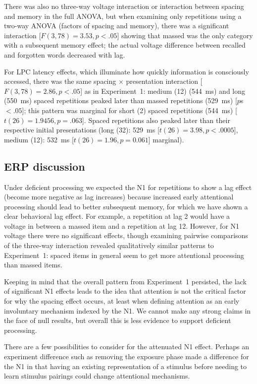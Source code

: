 There was also no three-way voltage interaction or interaction between spacing and memory in the full ANOVA, but when examining only repetitions using a two-way ANOVA (factors of spacing and memory), there was a significant interaction [$F(3,78)=3.53, p<.05$] showing that massed was the only category with a subsequent memory effect; the actual voltage difference between recalled and forgotten words decreased with lag.

For LPC latency effects, which illuminate how quickly information is consciously accessed, there was the same spacing $\times$ presentation interaction [$F(3,78)=2.86, p<.05$] as in Experiment~1: medium (12) (544~ms) and long (550~ms) spaced repetitions peaked later than massed repetitions (529~ms) [$p$s~$<.05$]; this pattern was marginal for short (2) spaced repetitions (544~ms) [$t(26)=1.9456, p=.063$].  Spaced repetitions also peaked later than their respective initial presentations (long (32): 529~ms [$t(26)=3.98, p<.0005$], medium (12): 532~ms [$t(26)=1.96, p=0.061$] marginal).

\subsection{ERP discussion}

Under deficient processing we expected the N1 for repetitions to show a lag effect (become more negative as lag increases) because increased early attentional processing should lead to better subsequent memory, for which we have shown a clear behavioral lag effect.  For example, a repetition at lag 2 would have a voltage in between a massed item and a repetition at lag 12.  However, for N1 voltage there were no significant effects, though examining pairwise comparisons of the three-way interaction revealed qualitatively similar patterns to Experiment~1: spaced items in general seem to get more attentional processing than massed items.

Keeping in mind that the overall pattern from Experiment~1 persisted, the lack of significant N1 effects leads to the idea that attention is not the critical factor for why the spacing effect occurs, at least when defining attention as an early involuntary mechanism indexed by the N1.  We cannot make any strong claims in the face of null results, but overall this is less evidence to support deficient processing.

There are a few possibilities to consider for the attenuated N1 effect.
Perhaps an experiment difference such as removing the exposure phase made a difference for the N1 in that having an existing representation of a stimulus before needing to learn stimulus pairings could change attentional mechanisms.

